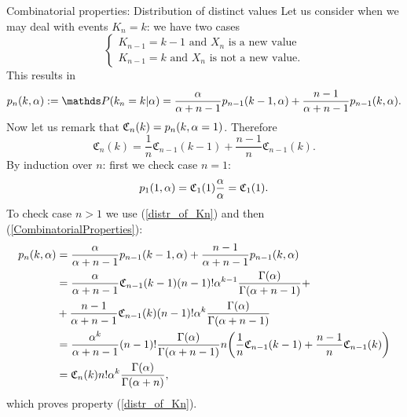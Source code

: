 \begin{frame}[allowframebreaks]{Combinatorial properties: Distribution of distinct values}
Let us consider when we may deal with events $K_n = k$: we have two cases
\begin{equation*}
    \left \{ \begin{matrix}
K_{n-1}=k-1 \text{ and } X_n \text{ is a new value}\\
K_{n-1} = k \text{ and } X_n \text{ is not a new value}.
\end{matrix}\right.
\end{equation*}
 This results in
\begin{equation}\label{CombinatorialProperties}
    p_n(k,\PrecisonParam) := \P(k_n = k|\PrecisonParam) = \frac{\PrecisonParam}{\PrecisonParam +n -1 }p_{n-1} (k-1,\PrecisonParam)+\frac{n-1}{\PrecisonParam +n -1}p_{n-1}(k,\PrecisonParam).
\end{equation}
Now let us remark that $\mathfrak{C}_n(k)=p_n(k,\alpha =1)$. Therefore
\begin{equation}\label{mathfrakC_property}
    \mathfrak{C}_n(k)=\frac 1n \mathfrak{C}_{n-1}(k-1)+\frac{n-1}{n}\mathfrak{C}_{n-1}(k).
\end{equation}
By induction over $n$: first we check case $n=1$:
\begin{equation*}
    p_1(1,\alpha)=\mathfrak{C}_1(1)\frac{\alpha}{\alpha}=\mathfrak{C}_1(1).
\end{equation*}
To check case $n>1$ we use (\ref{distr_of_Kn}) and then (\ref{CombinatorialProperties}):
\begin{equation*}
    \begin{split}
        p_n(k,\alpha)&=\frac{\alpha}{\alpha +n -1 }p_{n-1} (k-1,\alpha)+\frac{n-1}{\alpha +n -1}p_{n-1}(k,\alpha) \\
        &=\frac{\alpha}{\alpha +n -1 }\mathfrak{C}_{n-1}(k-1)(n-1)!\alpha^{k-1}\frac{\Gamma (\alpha)}{\Gamma(\alpha+n-1)} +\\
        &+\frac{n-1}{\alpha +n -1}\mathfrak{C}_{n-1}(k)(n-1)!\alpha^{k}\frac{\Gamma (\alpha)}{\Gamma(\alpha+n-1)}\\
        &=\frac{\alpha^k}{\alpha+n-1}(n-1)!\frac{\Gamma(\alpha)}{ \Gamma(\alpha+n-1) }n\bigg(\frac 1n \mathfrak{C}_{n-1}(k-1) + \frac{n-1}{n} \mathfrak{C}_{n-1}(k)\bigg)\\
        &=\mathfrak{C}_{n}(k)n!\alpha^k\frac{\Gamma(\alpha)}{\Gamma(\alpha+n)},
    \end{split}
\end{equation*}
which proves property (\ref{distr_of_Kn}).


\end{frame}
